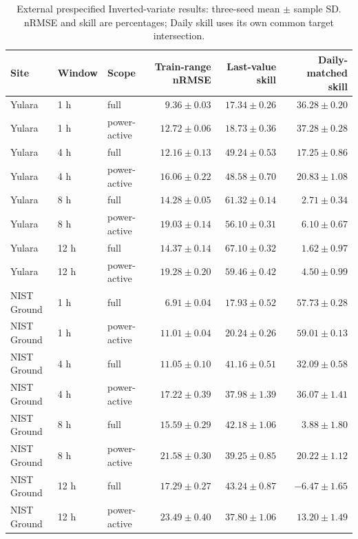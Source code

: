 \begin{table}[!tp]
\centering\small
\caption{External prespecified Inverted-variate results: three-seed mean $\pm$ sample SD. nRMSE and skill are percentages; Daily skill uses its own common target intersection.}
\label{tab:external}
\begin{tabular}{lllrrr}
\toprule Site & Window & Scope & Train-range nRMSE & Last-value skill & Daily-matched skill\\\midrule
Yulara & 1 h & full & $9.36\pm0.03$ & $17.34\pm0.26$ & $36.28\pm0.20$\\
Yulara & 1 h & power-active & $12.72\pm0.06$ & $18.73\pm0.36$ & $37.28\pm0.28$\\
Yulara & 4 h & full & $12.16\pm0.13$ & $49.24\pm0.53$ & $17.25\pm0.86$\\
Yulara & 4 h & power-active & $16.06\pm0.22$ & $48.58\pm0.70$ & $20.83\pm1.08$\\
Yulara & 8 h & full & $14.28\pm0.05$ & $61.32\pm0.14$ & $2.71\pm0.34$\\
Yulara & 8 h & power-active & $19.03\pm0.14$ & $56.10\pm0.31$ & $6.10\pm0.67$\\
Yulara & 12 h & full & $14.37\pm0.14$ & $67.10\pm0.32$ & $1.62\pm0.97$\\
Yulara & 12 h & power-active & $19.28\pm0.20$ & $59.46\pm0.42$ & $4.50\pm0.99$\\
NIST Ground & 1 h & full & $6.91\pm0.04$ & $17.93\pm0.52$ & $57.73\pm0.28$\\
NIST Ground & 1 h & power-active & $11.01\pm0.04$ & $20.24\pm0.26$ & $59.01\pm0.13$\\
NIST Ground & 4 h & full & $11.05\pm0.10$ & $41.16\pm0.51$ & $32.09\pm0.58$\\
NIST Ground & 4 h & power-active & $17.22\pm0.39$ & $37.98\pm1.39$ & $36.07\pm1.41$\\
NIST Ground & 8 h & full & $15.59\pm0.29$ & $42.18\pm1.06$ & $3.88\pm1.80$\\
NIST Ground & 8 h & power-active & $21.58\pm0.30$ & $39.25\pm0.85$ & $20.22\pm1.12$\\
NIST Ground & 12 h & full & $17.29\pm0.27$ & $43.24\pm0.87$ & $-6.47\pm1.65$\\
NIST Ground & 12 h & power-active & $23.49\pm0.40$ & $37.80\pm1.06$ & $13.20\pm1.49$\\
\bottomrule\end{tabular}
\end{table}